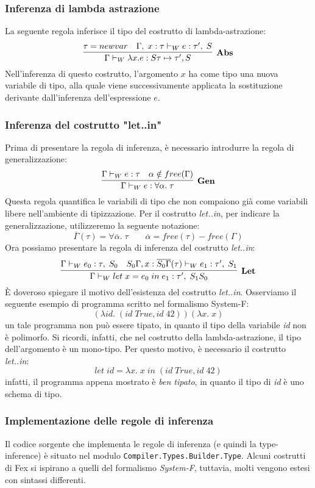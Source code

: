 \documentclass[10pt,a4paper]{article}
\begin{document}
\subsubsection{Inferenza di lambda astrazione}
La seguente regola inferisce il tipo del costrutto di lambda-astrazione:
\[ \infer[\textbf{Abs}]{\Gamma \vdash_W \lambda x. e : S\tau \mapsto \tau', S}{\tau = newvar & \Gamma, \; x : \tau \vdash_W e : \tau', \; S} \]
Nell'inferenza di questo costrutto, l'argomento $ x $ ha come tipo una nuova variabile di tipo, alla quale viene
successivamente applicata la sostituzione derivante dall'inferenza dell'espressione $ e $.

\subsubsection{Inferenza del costrutto "let..in"}
Prima di presentare la regola di inferenza, è necessario introdurre la regola di generalizzazione:
\[ \infer[\textbf{Gen}]{\Gamma \vdash_W e : \forall \alpha. \; \tau}{\Gamma \vdash_W e : \tau & \alpha \notin free(\Gamma)} \]
Questa regola quantifica le variabili di tipo che non compaiono già come variabili libere nell'ambiente di tipizzazione.
Per il costrutto \textit{let..in}, per indicare la generalizzazione, utilizzeremo la seguente notazione:
\[ \overline{\Gamma}(\tau) = \forall \overline{\alpha}. \; \tau \qquad \overline{\alpha} = free(\tau) - free(\Gamma) \]
Ora possiamo presentare la regola di inferenza del costrutto \textit{let..in}:
\[ \infer[\textbf{Let}]{\Gamma \vdash_W let \; x = e_0 \; in \; e_1 : \tau', \; S_1S_0}{\Gamma \vdash_W e_0 : \tau, \; S_0 & S_0\Gamma, x : \overline{S_0\Gamma}(\tau) \vdash_W e_1 : \tau', \; S_1} \]
\`E doveroso spiegare il motivo dell'esistenza del costrutto \textit{let..in}. Osserviamo il seguente esempio di
programma scritto nel formalismo System-F:
\[ (\lambda id. \; (id \; True, id \; 42)) (\lambda x. \; x) \]
un tale programma non può essere tipato, in quanto il tipo della variabile \textit{id} non è polimorfo. Si ricordi,
infatti, che nel costrutto della lambda-astrazione, il tipo dell'argomento è un mono-tipo. Per questo motivo, è
necessario il costrutto \textit{let..in}:
\[ let \; id = \lambda x. \; x \; in \; (id \; True, id \; 42) \]
infatti, il programma appena mostrato è \textit{ben tipato}, in quanto il tipo di \textit{id} è uno schema di tipo.

\subsubsection{Implementazione delle regole di inferenza}
Il codice sorgente che implementa le regole di inferenza (e quindi la type-inference) è situato nel modulo
\texttt{Compiler.Types.Builder.Type}. Alcuni costrutti di Fex si ispirano a quelli del formalismo \textit{System-F},
tuttavia, molti vengono estesi con sintassi differenti.
\end{document}
